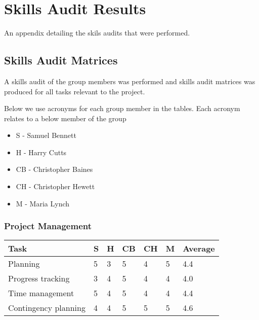\chapter{Skills Audit Results} \label{Chapter:Skills Audit Results}

\begin{preamble}
	An appendix detailing the skils audits that were performed.

\end{preamble}

\section{Skills Audit Matrices} 
\label{Section:Skills Audit Matrices}
A skills audit of the group members was performed and skills audit matrices was produced for all tasks relevant to the project.

Below we use acronyms for each group member in the tables. Each acronym relates to a below member of the group

\begin{itemize}
\item S - Samuel Bennett
\item H - Harry Cutts
\item CB - Christopher Baines
\item CH - Christopher Hewett
\item M - Maria Lynch
\end{itemize}

\subsection{Project Management} 
\begin{tabular}{ l || l | l | l | l | l || l}
  Task & S & H & CB & CH & M & Average \\ \hline
  Planning & 5  &  3  &  5  &  4  &  5  &  4.4 \\ 
  Progress tracking &  3  &  4  &  5  &  4  &  4  &  4.0 \\
  Time management &  5  &  4  &  5  &  4  &  4  &  4.4 \\
  Contingency planning &  4  &  4  &  5  &  5  &  5  &  4.6 \\
\end{tabular}


